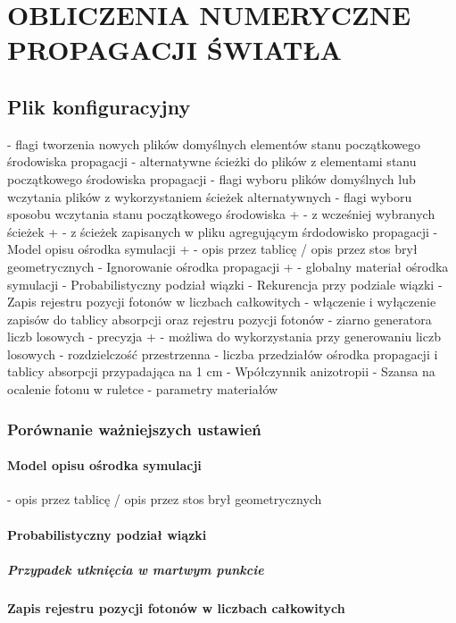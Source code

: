 \chapter{OBLICZENIA NUMERYCZNE PROPAGACJI ŚWIATŁA}
\label{chpt:obliczenia-numeryczne-propagacji-światła}
\section{Plik konfiguracyjny}
- flagi tworzenia nowych plików domyślnych elementów stanu początkowego środowiska propagacji
- alternatywne ścieżki do plików z elementami stanu początkowego środowiska propagacji
- flagi wyboru plików domyślnych lub wczytania plików z wykorzystaniem ścieżek alternatywnych
- flagi wyboru sposobu wczytania stanu początkowego środowiska
+    - z wcześniej wybranych ścieżek
+    - z ścieżek zapisanych w pliku agregującym śrdodowisko propagacji
- Model opisu ośrodka symulacji
+    - opis przez tablicę / opis przez stos brył geometrycznych
- Ignorowanie ośrodka propagacji
+    - globalny materiał ośrodka symulacji
- Probabilistyczny podział wiązki
- Rekurencja przy podziale wiązki
- Zapis rejestru pozycji fotonów w liczbach całkowitych
- włączenie i wyłączenie zapisów do tablicy absorpcji oraz rejestru pozycji fotonów
- ziarno generatora liczb losowych
- precyzja
+    - możliwa do wykorzystania przy generowaniu liczb losowych
- rozdzielczość przestrzenna - liczba przedziałów ośrodka propagacji i tablicy absorpcji przypadająca na 1 cm
- Wpółczynnik anizotropii
- Szansa na ocalenie fotonu w ruletce
- parametry materiałów

\subsection{Porównanie ważniejszych ustawień}
\subsubsection{Model opisu ośrodka symulacji}
- opis przez tablicę / opis przez stos brył geometrycznych
\subsubsection{Probabilistyczny podział wiązki}
\paragraph{Przypadek utknięcia w martwym punkcie}
\subsubsection{Zapis rejestru pozycji fotonów w liczbach całkowitych}
